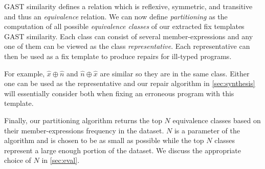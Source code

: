 GAST similarity defines a relation which is reflexive, symmetric, and transitive
and thus an \emph{equivalence} relation. We can now define \emph{partitioning}
as the computation of all possible \emph{equivalence classes} of our extracted
fix templates \wrt GAST similarity. Each class can consist of several
member-expressions and any one of them can be viewed as the class
\emph{representative}. Each representative can then be used as a fix template to
produce repairs for ill-typed programs.

For example, $\hat{x} \oplus \hat{n}$ and $\hat{n} \oplus \hat{x}$ are similar
so they are in the same class. Either one can be used as the representative and
our repair algorithm in \autoref{sec:synthesis} will essentially consider both
when fixing an erroneous program with this template.

Finally, our partitioning algorithm returns the top $N$ equivalence classes
based on their member-expressions frequency in the dataset. $N$ is a parameter
of the algorithm and is chosen to be as small as possible while the top $N$
classes represent a large enough portion of the dataset. We discuss the
appropriate choice of $N$ in \autoref{sec:eval}.
